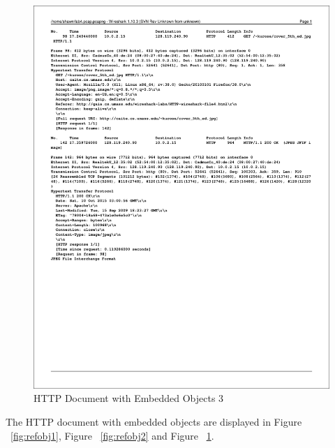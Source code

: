 \documentclass[titlepage, paper=a4, fontsize=11pt]{scrartcl} %
\numberwithin{equation}{section} %
\numberwithin{figure}{section} %
\numberwithin{table}{section} %
\begin{document}
\begin{figure}[!ht]
    \includegraphics[width=\textwidth]{images/refobj3.pdf}
    \caption{HTTP Document with Embedded Objects 3}
    \label{fig:refobj3}
\end{figure}

\newpage
The HTTP document with embedded objects are displayed in Figure ~\ref{fig:refobj1}, Figure ~\ref{fig:refobj2} and Figure ~\ref{fig:refobj3}.
\\
\end{document}

